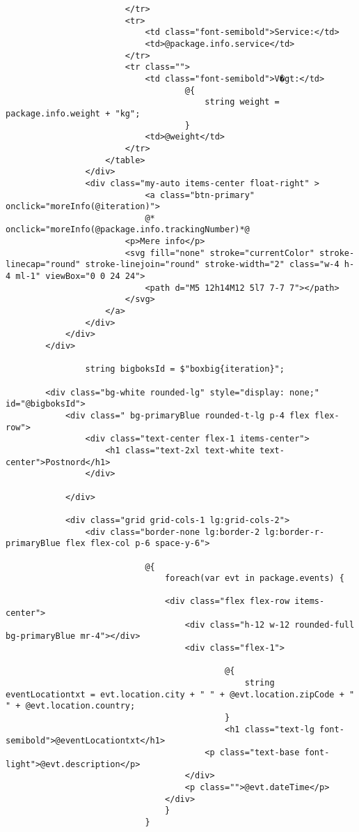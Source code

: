 \begin{verbatim}
                        </tr>
                        <tr>
                            <td class="font-semibold">Service:</td>
                            <td>@package.info.service</td>
                        </tr>
                        <tr class="">
                            <td class="font-semibold">V�gt:</td>
                                    @{
                                        string weight = package.info.weight + "kg";
                                    }
                            <td>@weight</td>
                        </tr>
                    </table>
                </div>
                <div class="my-auto items-center float-right" >
                            <a class="btn-primary" onclick="moreInfo(@iteration)">
                            @* onclick="moreInfo(@package.info.trackingNumber)*@
                        <p>Mere info</p>
                        <svg fill="none" stroke="currentColor" stroke-linecap="round" stroke-linejoin="round" stroke-width="2" class="w-4 h-4 ml-1" viewBox="0 0 24 24">
                            <path d="M5 12h14M12 5l7 7-7 7"></path>
                        </svg>
                    </a>
                </div>
            </div>
        </div>
        
                string bigboksId = $"boxbig{iteration}";
        
        <div class="bg-white rounded-lg" style="display: none;" id="@bigboksId">
            <div class=" bg-primaryBlue rounded-t-lg p-4 flex flex-row">
                <div class="text-center flex-1 items-center">
                    <h1 class="text-2xl text-white text-center">Postnord</h1>
                </div>

            </div>

            <div class="grid grid-cols-1 lg:grid-cols-2">
                <div class="border-none lg:border-2 lg:border-r-primaryBlue flex flex-col p-6 space-y-6">

                            @{
                                foreach(var evt in package.events) {

                                <div class="flex flex-row items-center">
                                    <div class="h-12 w-12 rounded-full bg-primaryBlue mr-4"></div>
                                    <div class="flex-1">

                                            @{
                                                string eventLocationtxt = evt.location.city + " " + @evt.location.zipCode + " " + @evt.location.country;
                                            }
                                            <h1 class="text-lg font-semibold">@eventLocationtxt</h1>
                                        <p class="text-base font-light">@evt.description</p>
                                    </div>
                                    <p class="">@evt.dateTime</p>
                                </div>
                                }
                            }



\end{verbatim}
